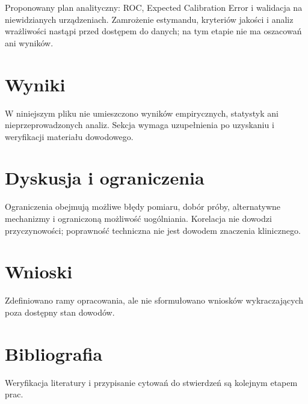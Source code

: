 \documentclass[11pt,a4paper]{article}
\begin{document}
Proponowany plan analityczny: ROC, Expected Calibration Error i walidacja na niewidzianych urządzeniach. Zamrożenie estymandu, kryteriów jakości i analiz wrażliwości nastąpi przed dostępem do danych; na tym etapie nie ma oszacowań ani wyników.

\section{Wyniki}

W niniejszym pliku nie umieszczono wyników empirycznych, statystyk ani nieprzeprowadzonych analiz. Sekcja wymaga uzupełnienia po uzyskaniu i weryfikacji materiału dowodowego.

\section{Dyskusja i ograniczenia}

Ograniczenia obejmują możliwe błędy pomiaru, dobór próby, alternatywne mechanizmy i ograniczoną możliwość uogólniania. Korelacja nie dowodzi przyczynowości; poprawność techniczna nie jest dowodem znaczenia klinicznego.

\section{Wnioski}

Zdefiniowano ramy opracowania, ale nie sformułowano wniosków wykraczających poza dostępny stan dowodów.

\section*{Bibliografia}

Weryfikacja literatury i przypisanie cytowań do stwierdzeń są kolejnym etapem prac.
\end{document}
